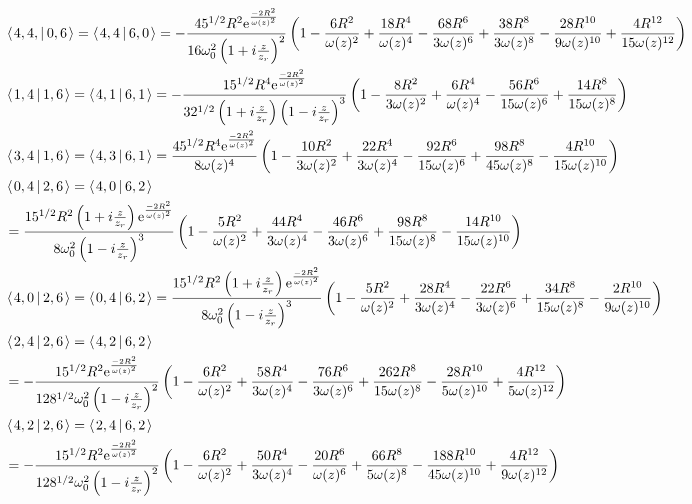 \documentclass[11pt]{amsart}
\makeatletter
\newcommand{\e}{{\rm e}}				%
\newcommand{\msp}[1]{\mspace{#1mu}}		%
\newcommand{\0}{\varnothing}		%
\newcommand{\brac}[2]{\left\langle\msp{2} #1\left\lvert \msp{3.5} #2 \right.\right\rangle}	%
\newcommand{\1}{!}
\newcommand{\2}{@}
\newcommand{\3}{\#}
\newcommand{\4}{\$}
\newcommand{\5}{\%}
\newcommand{\6}{$^\wedge$}
\newcommand{\7}{\&}
\newcommand{\8}{*}
\newcommand{\9}{(}
\makeatother
\begin{document}
\begin{align*}
 \\
 &
 \brac{4,4,}{0,6} = \brac{4,4}{6,0} = -\frac{45^{1/2}R^2\e^{\frac{-2R^2}{\omega(z)^2}}}{16\omega_0^2\left(1+i\frac{z}{z_r}\right)^2}\left(1-\frac{6R^2}{\omega(z)^2}+\frac{18R^4}{\omega(z)^4}-\frac{68R^6}{3\omega(z)^6}+\frac{38R^8}{3\omega(z)^8}-\frac{28R^{10}}{9\omega(z)^{10}}+\frac{4R^{12}}{15\omega(z)^{12}}\right)
 \\
 &
 \brac{1,4}{1,6} = \brac{4,1}{6,1} = -\frac{15^{1/2}R^4\e^{\frac{-2R^2}{\omega(z)^2}}}{32^{1/2}\left(1+i\frac{z}{z_r}\right)\left(1-i\frac{z}{z_r}\right)^3}\left(1-\frac{8R^2}{3\omega(z)^2}+\frac{6R^4}{\omega(z)^4}-\frac{56R^6}{15\omega(z)^6}+\frac{14R^8}{15\omega(z)^8}\right)
 \\
 &
 \brac{3,4}{1,6} = \brac{4,3}{6,1} = \frac{45^{1/2}R^4\e^{\frac{-2R^2}{\omega(z)^2}}}{8\omega(z)^4}\left(1-\frac{10R^2}{3\omega(z)^2}+\frac{22R^4}{3\omega(z)^4}-\frac{92R^6}{15\omega(z)^6}+\frac{98R^8}{45\omega(z)^8}-\frac{4R^{10}}{15\omega(z)^{10}}\right)
 \\
 &
 \brac{0,4}{2,6} = \brac{4,0}{6,2} 
 \\
 &= \frac{15^{1/2}R^2\left(1+i\frac{z}{z_r}\right)\e^{\frac{-2R^2}{\omega(z)^2}}}{8\omega_0^2\left(1-i\frac{z}{z_r}\right)^3}\left(1-\frac{5R^2}{\omega(z)^2}+\frac{44R^4}{3\omega(z)^4}-\frac{46R^6}{3\omega(z)^6}+\frac{98R^8}{15\omega(z)^8}-\frac{14R^{10}}{15\omega(z)^{10}}\right)
 \\
 &
 \brac{4,0}{2,6} = \brac{0,4}{6,2} = \frac{15^{1/2}R^2\left(1+i\frac{z}{z_r}\right)\e^{\frac{-2R^2}{\omega(z)^2}}}{8\omega_0^2\left(1-i\frac{z}{z_r}\right)^3}\left(1-\frac{5R^2}{\omega(z)^2}+\frac{28R^4}{3\omega(z)^4}-\frac{22R^6}{3\omega(z)^6}+\frac{34R^8}{15\omega(z)^8}-\frac{2R^{10}}{9\omega(z)^{10}}\right)
 \\
 &
 \brac{2,4}{2,6} = \brac{4,2}{6,2} 
 \\
 &
 = -\frac{15^{1/2}R^2\e^{\frac{-2R^2}{\omega(z)^2}}}{128^{1/2}\omega_0^2\left(1-i\frac{z}{z_r}\right)^2}\left(1-\frac{6R^2}{\omega(z)^2}+\frac{58R^4}{3\omega(z)^4}-\frac{76R^6}{3\omega(z)^6}+\frac{262R^8}{15\omega(z)^8}-\frac{28R^{10}}{5\omega(z)^{10}}+\frac{4R^{12}}{5\omega(z)^{12}}\right)
 \\
 &
 \brac{4,2}{2,6} = \brac{2,4}{6,2} 
 \\
 &
 = -\frac{15^{1/2}R^2\e^{\frac{-2R^2}{\omega(z)^2}}}{128^{1/2}\omega_0^2\left(1-i\frac{z}{z_r}\right)^2}\left(1-\frac{6R^2}{\omega(z)^2}+\frac{50R^4}{3\omega(z)^4}-\frac{20R^6}{\omega(z)^6}+\frac{66R^8}{5\omega(z)^8}-\frac{188R^{10}}{45\omega(z)^{10}}+\frac{4R^{12}}{9\omega(z)^{12}}\right)
 \end{align*}
\end{document}

